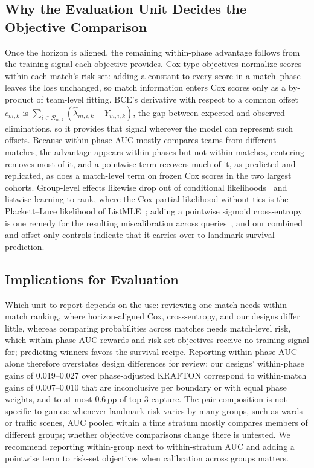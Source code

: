 \documentclass[sigconf,anonymous,nonacm]{acmart}
\begin{document}
\subsection{Why the Evaluation Unit Decides the Objective Comparison}
\label{sec:discussion:drivers}
Once the horizon is aligned, the remaining within-phase advantage follows from the training signal each objective provides. Cox-type objectives normalize scores within each match's risk set: adding a constant to every score in a match--phase leaves the loss unchanged, so match information enters Cox scores only as a by-product of team-level fitting. BCE's derivative with respect to a common offset $c_{m,k}$ is $\sum_{i\in\mathcal{R}_{m,k}}(\hat\lambda_{m,i,k}-Y_{m,i,k})$, the gap between expected and observed eliminations, so it provides that signal wherever the model can represent such offsets. Because within-phase AUC mostly compares teams from different matches, the advantage appears within phases but not within matches, centering removes most of it, and a pointwise term recovers much of it, as predicted and replicated, as does a match-level term on frozen Cox scores in the two largest cohorts. Group-level effects likewise drop out of conditional likelihoods~\cite{Chamberlain80} and listwise learning to rank, where the Cox partial likelihood without ties is the Plackett--Luce likelihood of ListMLE~\cite{Xia08}; adding a pointwise sigmoid cross-entropy is one remedy for the resulting miscalibration across queries~\cite{Bai23}, and our combined and offset-only controls indicate that it carries over to landmark survival prediction.

\subsection{Implications for Evaluation}
\label{sec:discussion:implications}
Which unit to report depends on the use: reviewing one match needs within-match ranking, where horizon-aligned Cox, cross-entropy, and our designs differ little, whereas comparing probabilities across matches needs match-level risk, which within-phase AUC rewards and risk-set objectives receive no training signal for; predicting winners favors the survival recipe. Reporting within-phase AUC alone therefore overstates design differences for review: our designs' within-phase gains of 0.019--0.027 over phase-adjusted KRAFTON correspond to within-match gains of 0.007--0.010 that are inconclusive per boundary or with equal phase weights, and to at most 0.6\,pp of top-3 capture. The pair composition is not specific to games: whenever landmark risk varies by many groups, such as wards or traffic scenes, AUC pooled within a time stratum mostly compares members of different groups; whether objective comparisons change there is untested. We recommend reporting within-group next to within-stratum AUC and adding a pointwise term to risk-set objectives when calibration across groups matters.
\end{document}
